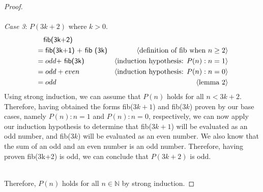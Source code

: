 \documentclass[11pt,fleqn]{article}
\newcommand{\mname}[1]{\mbox{\sf #1}}
\newcommand{\pnote}[1]{{\langle \text{#1} \rangle}}
\begin{document}
\begin{enumerate}
\begin{proof}
    \\\\
    \emph{Case 3}: $P(3k+2)$ where $k > 0$.
    \begin{align*}
      &\phantom{{}=} \mname {fib(3k+2)} \\
      &= \mname{fib(3k+1) + fib (3k)}  & \pnote{definition of fib when $n \ge 2$}\\
      &= odd \mname{ + fib(3k)}  & \pnote{induction hypothesis: $P(n): n = 1$}\\
      &= odd + even  & \pnote{induction hypothesis: $P(n): n = 0$}\\
      &= odd  & \pnote{lemma 2}
    \end{align*}
    Using strong induction, we can assume that $P(n)$ holds for all $n<3k+2$. Therefore, having obtained the forms fib($3k+1$) and fib($3k$) proven by our base cases, namely $P(n): n = 1$ and $P(n): n = 0$, respectively, we can now apply our induction hypothesis to determine that fib($3k+1$) will be evaluated as an odd number, and fib($3k$) will be evaluated as an even number. We also know that the sum of an odd and an even number is an odd number. Therefore, having proven fib(3k+2) is odd, we can conclude that $P(3k+2)$ is odd.
    \\\\
    \medskip
    
    Therefore, $P(n)$ holds for all $n \in \mathbb{N}$ by
    strong induction.
  \end{proof} 

\end{enumerate}
\end{document}
